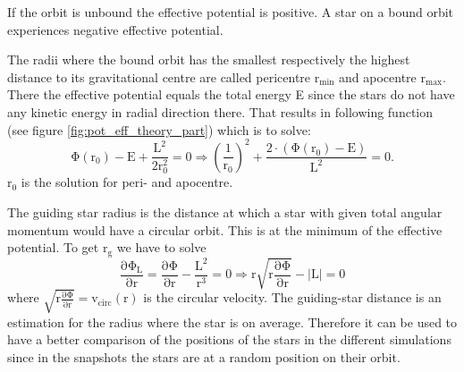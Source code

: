If the orbit is unbound the effective potential is positive. A star on a bound orbit experiences negative effective potential. 
\par The radii where the bound orbit has the smallest respectively the highest distance to its gravitational centre are called pericentre \(\mathrm{r_{min}}\)  and apocentre \(\mathrm{r_{max}}\).  There the effective potential equals the total energy E since the stars do not have any kinetic energy in radial direction there. That results in following function (see figure \ref{fig:pot_eff_theory_part}) which is to solve: 
\begin{equation}\label{eq:root_pot_eff}
\mathrm {\Phi(r_0)-E +\frac{L^2}{2r_0^2}=0\Rightarrow\left(\frac{1}{r_0}\right)^2+\frac{2\cdot (\Phi(r_0)-E)}{L^2}=0.}
\end{equation}
r\(_0\) is the solution for peri- and apocentre.
\par The guiding star radius is the distance at which a star with given total angular momentum would have a circular orbit. This is at the minimum of the effective potential. To get \(\mathrm{r_g}\) we have to solve
\begin{equation}\label{eq:min_pot_eff}
\mathrm{\frac{\partial\Phi_L}{\partial r}=\frac{\partial\Phi}{\partial r}-\frac{L^2}{r^3}=0\Rightarrow r\sqrt{r\frac{\partial\Phi}{\partial r}}-|L|=0}
\end{equation} where \(\mathrm{\sqrt{r\frac{\partial\Phi}{\partial r}}=v_{circ}(r)}\) is the circular velocity. The guiding-star distance is an estimation for the radius where the star is on average. Therefore it can be used to have a better comparison of the positions of the stars in the different simulations since in the snapshots the stars are at a random position on their orbit.

